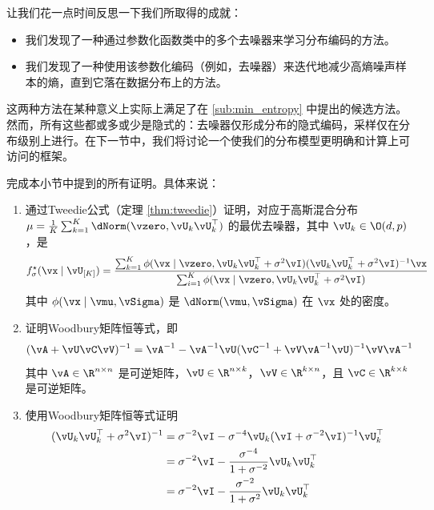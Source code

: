 \documentclass[../../book-main.tex]{subfiles}
\begin{document}
让我们花一点时间反思一下我们所取得的成就：
\begin{itemize}
    \item 我们发现了一种通过参数化函数类中的多个去噪器来学习分布编码的方法。
    \item 我们发现了一种使用该参数化编码（例如，去噪器）来迭代地减少高熵噪声样本的熵，直到它落在数据分布上的方法。
\end{itemize}
这两种方法在某种意义上实际上满足了在 \eqref{sub:min_entropy} 中提出的候选方法。然而，所有这些都或多或少是隐式的：去噪器仅形成分布的隐式编码，采样仅在分布级别上进行。在下一节中，我们将讨论一个使我们的分布模型更明确和计算上可访问的框架。

\begin{exercise}
    完成本小节中提到的所有证明。具体来说：
    \begin{enumerate}
        \item 通过Tweedie公式（定理 \ref{thm:tweedie}）证明，对应于高斯混合分布 \(\mu = \frac{1}{K}\sum_{k = 1}^{K}\dNorm(\vzero, \vU_{k}\vU_{k}^{\top})\) 的最优去噪器，其中 \(\vU_{k} \in \O(d, p)\)，是
        \begin{equation}
            f_{\sigma}^{\star}(\vx \mid \vU_{[K]}) = \frac{\sum_{k = 1}^{K}\phi(\vx \mid \vzero, \vU_{k}\vU_{k}^{\top} + \sigma^{2}\vI)(\vU_{k}\vU_{k}^{\top} + \sigma^{2}\vI)^{-1}\vx}{\sum_{i = 1}^{K}\phi(\vx \mid \vzero, \vU_{k}\vU_{k}^{\top} + \sigma^{2}\vI)}
        \end{equation}
        其中 \(\phi(\vx \mid \vmu, \vSigma)\) 是 \(\dNorm(\vmu, \vSigma)\) 在 \(\vx\) 处的密度。
        \item 证明Woodbury矩阵恒等式，即
        \begin{equation}
            (\vA + \vU\vC\vV)^{-1} = \vA^{-1} - \vA^{-1}\vU(\vC^{-1} + \vV\vA^{-1}\vU)^{-1}\vV\vA^{-1}
        \end{equation}
        其中 \(\vA \in \R^{n \times n}\) 是可逆矩阵，\(\vU \in \R^{n \times k}\)，\(\vV \in \R^{k \times n}\)，且 \(\vC \in \R^{k \times k}\) 是可逆矩阵。
        \item 使用Woodbury矩阵恒等式证明
        \begin{align}
            (\vU_{k}\vU_{k}^{\top} + \sigma^{2}\vI)^{-1} 
            &= \sigma^{-2}\vI - \sigma^{-4}\vU_{k}(\vI + \sigma^{-2}\vI)^{-1}\vU_{k}^{\top} \\ 
            &= \sigma^{-2}\vI - \frac{\sigma^{-4}}{1 + \sigma^{-2}}\vU_{k}\vU_{k}^{\top} \\ 
            &= \sigma^{-2}\vI - \frac{\sigma^{-2}}{1 + \sigma^{2}}\vU_{k}\vU_{k}^{\top} \\ 

\end{align}
\end{enumerate}
\end{exercise}
\end{document}

